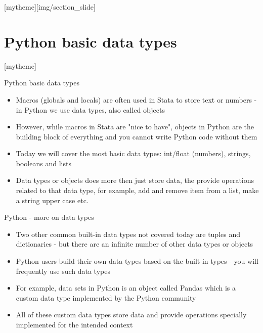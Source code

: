 \documentclass[aspectratio=169]{beamer}
\newcommand{\sectionpic}[2]{
	\setbeamertemplate{section page}[mytheme][#2]
	\section{#1}
	\setbeamertemplate{section page}[mytheme]
}
\begin{document}
\sectionpic{Python basic data types}{img/section_slide}

\begin{frame}{Python basic data types}

	\begin{itemize}
		\item Macros (globals and locals) are often used in Stata to store text or numbers 
		- in Python we use data types, also called objects
		\item However, while macros in Stata are "nice to have", 
		objects in Python are the building block of everything 
		and you cannot write Python code without them
		\item Today we will cover the most basic data types: 
		int/float (numbers), strings, booleans and lists
		\item Data types or objects does more then just store data, 
		the provide operations related to that data type, 
		for example, add and remove item from a list, make a string upper case etc.
		
	\end{itemize}
\end{frame}

\begin{frame}{Python - more on data types}

	\begin{itemize}
		\item Two other common built-in data types not covered today are tuples and dictionaries 
		- but there are an infinite number of other data types or objects
		\item Python users build their own data types based on the built-in types 
		- you will frequently use such data types
		\item For example, data sets in Python is an object called Pandas 
		which is a custom data type implemented by the Python community
		\item All of these custom data types store data 
		and provide operations specially implemented for the intended context
	\end{itemize}
\end{frame}
\end{document}
